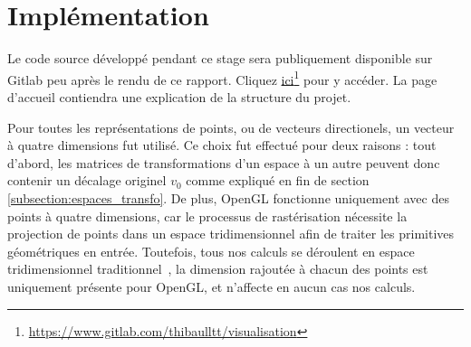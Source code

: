{	\section{Implémentation}\label{section:implementation}
	{

        Le code source développé pendant ce stage sera publiquement disponible sur Gitlab peu après le rendu de ce rapport. Cliquez \href{https://www.gitlab.com/thibaulltt/visualisation}{ici}\footnote{\url{https://www.gitlab.com/thibaulltt/visualisation}} pour y accéder. La page d'accueil contiendra une explication de la structure du projet.
        
         Pour toutes les représentations de points, ou de vecteurs directionels, un vecteur à quatre dimensions fut utilisé. Ce choix fut effectué pour deux raisons : tout d'abord, les matrices de transformations d'un espace à un autre peuvent donc contenir un décalage originel $v_0$ comme expliqué en fin de section \ref{subsection:espaces_transfo}. De plus, OpenGL fonctionne uniquement avec des points à quatre dimensions, car le processus de rastérisation nécessite la projection de points dans un espace tridimensionnel afin de traiter les primitives géométriques en entrée. Toutefois, tous nos calculs se déroulent en espace tridimensionnel \og{}traditionnel~\fg, la dimension rajoutée à chacun des points est uniquement présente pour OpenGL, et n'affecte en aucun cas nos calculs.
	    
}}
